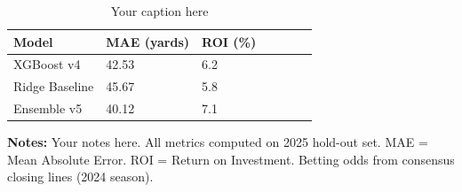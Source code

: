%
%
%

\begin{table}[htbp]
\centering
\caption{Your caption here}
\label{tab:your-label}

\begin{adjustbox}{max width=\textwidth}
\begin{tabular}{l MAE ROI}  %
\toprule
\textbf{Model} & \textbf{MAE (yards)} & \textbf{ROI (\%)} \\
\midrule

XGBoost v4      & 42.53 & 6.2 \\
Ridge Baseline  & 45.67 & 5.8 \\
Ensemble v5     & 40.12 & 7.1 \\

\bottomrule
\end{tabular}
\end{adjustbox}

\vspace{2mm}
\begin{minipage}{\linewidth}
\small
\textbf{Notes:} Your notes here. All metrics computed on 2025 hold-out set. MAE = Mean Absolute Error. ROI = Return on Investment. Betting odds from consensus closing lines (2024 season).
\end{minipage}

\end{table}

%
%
%
%
%
